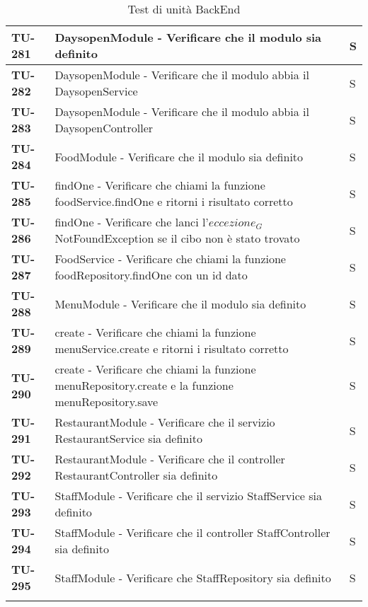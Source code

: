\begin{longtable}{|>{\centering\arraybackslash}p{2cm}|p{15cm}|p{1cm}|}
  \rowcolor{gray!10}
  \textbf{TU-281} & DaysopenModule - Verificare che il modulo sia definito  & S \\ 
  \hline
  \rowcolor{gray!10}
  \textbf{TU-282} & DaysopenModule - Verificare che il modulo abbia il DaysopenService  & S \\ 
  \hline
  \rowcolor{gray!10}
  \textbf{TU-283} & DaysopenModule - Verificare che il modulo abbia il DaysopenController  & S \\ 
  \hline
  \rowcolor{gray!10}
  \textbf{TU-284} & FoodModule - Verificare che il modulo sia definito  & S \\ 
  \hline
  \rowcolor{gray!10}
  \textbf{TU-285} & findOne - Verificare che chiami la funzione foodService.findOne e ritorni i risultato corretto & S \\ 
  \hline
  \rowcolor{gray!10}
  \textbf{TU-286} & findOne - Verificare che lanci l'$\textit{eccezione}_G$ NotFoundException se il cibo non è stato trovato & S \\ 
  \hline
  \rowcolor{gray!10}
  \textbf{TU-287} & FoodService - Verificare che chiami la funzione foodRepository.findOne con un id dato & S \\ 
  \hline
  \rowcolor{gray!10}
  \textbf{TU-288} & MenuModule - Verificare che il modulo sia definito & S \\ 
  \hline
  \rowcolor{gray!10}
  \textbf{TU-289} & create - Verificare che chiami la funzione menuService.create e ritorni i risultato corretto & S \\ 
  \hline
  \rowcolor{gray!10}
  \textbf{TU-290} & create - Verificare che chiami la funzione menuRepository.create e la funzione menuRepository.save & S \\ 
  \hline
  \rowcolor{gray!10}
  \textbf{TU-291} & RestaurantModule - Verificare che il servizio RestaurantService sia definito & S \\ 
  \hline
  \rowcolor{gray!10}
  \textbf{TU-292} & RestaurantModule - Verificare che il controller RestaurantController sia definito & S \\ 
  \hline
  \rowcolor{gray!10}
  \textbf{TU-293} & StaffModule - Verificare che il servizio StaffService sia definito & S \\ 
  \hline
  \rowcolor{gray!10}
  \textbf{TU-294} & StaffModule - Verificare che il controller StaffController sia definito & S \\ 
  \hline
  \rowcolor{gray!10}
  \textbf{TU-295} & StaffModule - Verificare che StaffRepository sia definito & S \\ 
  \hline
  


  
  \caption{Test di unità BackEnd} 
\end{longtable}

